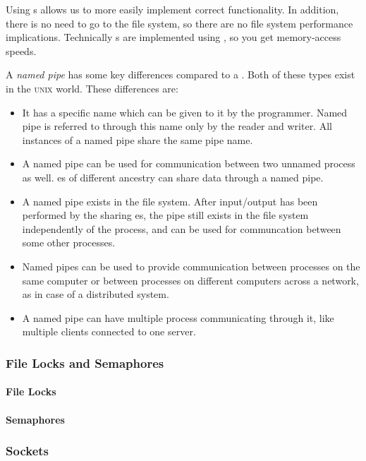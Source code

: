 Using s allows us to more easily implement correct  functionality.
In addition, there is no need to go to the file system, so there are no file system performance implications.
Technically s are implemented using , so you get memory-access speeds.

\begin{definition}\label{def:Named_Pipe}
  A \emph{named pipe} has some key differences compared to a .
  Both of these types exist in the \textsc{unix} world.
  These differences are:
  \begin{itemize}[noitemsep]
  \item It has a specific name which can be given to it by the programmer.
    Named pipe is referred to through this name only by the reader and writer.
    All instances of a named pipe share the same pipe name.
  \item A named pipe can be used for communication between two unnamed process as well.
    es of different ancestry can share data through a named pipe.
  \item A named pipe exists in the file system.
    After input/output has been performed by the sharing es, the pipe still exists in the file system independently of the process, and can be used for communcation between some other processes.
  \item Named pipes can be used to provide communication between processes on the same computer or between processes on different computers across a network, as in case of a distributed system.
  \item A named pipe can have multiple process communicating through it, like multiple clients connected to one server.
  \end{itemize}
\end{definition}

\subsubsection{File Locks and Semaphores}\label{subsubsec:IPC_Mechanism-File_Locks_Semaphores}
\paragraph{File Locks}\label{par:File_Locks}
\paragraph{Semaphores}\label{par:Semaphores}
\subsubsection{Sockets}\label{subsubsec:Sockets}

